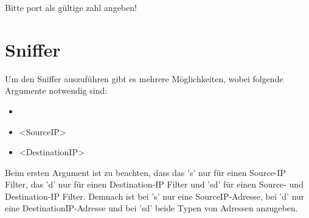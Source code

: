 \documentclass[a4paper,12pt]{scrreprt}
\begin{document}
	Bitte port als gültige zahl angeben!
\section{Sniffer}
	Um den Sniffer auszuführen gibt es mehrere Möglichkeiten, wobei folgende Argumente notwendig sind:
	\begin{itemize}
	\item <s|d|sd>
	\item <SourceIP>
	\item <DestinationIP>
	\end{itemize} 
	
	Beim ersten Argument ist zu beachten, dass das 's' nur für einen Source-IP Filter, das 'd' nur für einen Destination-IP Filter und 'sd' für einen Source- und Destination-IP Filter. Demnach ist bei 's' nur eine SourceIP-Adresse, bei 'd' nur eine DestinationIP-Adresse und bei 'sd' beide Typen von Adressen anzugeben.
\end{document}
